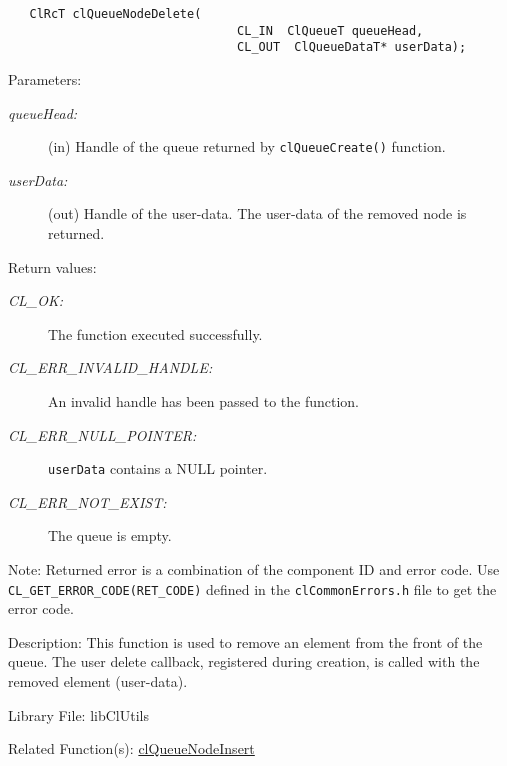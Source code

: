 \begin{flushleft}
\begin{Desc}
\footnotesize\begin{verbatim}   ClRcT clQueueNodeDelete(
                       			CL_IN  ClQueueT queueHead,
                       			CL_OUT  ClQueueDataT* userData);
\end{verbatim}
\normalsize
\end{Desc}
\begin{Desc}
\item[Parameters:]
\begin{description}
\item[{\em queue\-Head:}](in) Handle of the queue returned by {\tt{cl\-Queue\-Create()}} function. \item[{\em user\-Data:}](out) Handle of the user-data. 
The user-data of the removed node is returned.\end{description}
\end{Desc}
\begin{Desc}
\item[Return values:]
\begin{description}
\item[{\em CL\_\-OK:}]The function executed successfully. 
\item[{\em CL\_\-ERR\_\-INVALID\_\-HANDLE:}]An invalid handle has been passed to the function. 
\item[{\em CL\_\-ERR\_\-NULL\_\-POINTER:}]{\tt{userData}} contains a NULL pointer.
\item[{\em CL\_\-ERR\_\-NOT\_\-EXIST:}]The queue is empty.\end{description}
\end{Desc}
\begin{Desc}
\item[Note:]Returned error is a combination of the component ID and error code. Use
{\tt {CL\_\-GET\_\-ERROR\_\-CODE(RET\_\-CODE)}} defined in the {\tt{clCommonErrors.h}} file to get the error code.\end{Desc}
\begin{Desc}
\item[Description:]This function is used to remove an element from the front of the queue. The user delete callback, registered during creation, is 
called with the removed element (user-data).\end{Desc}
\begin{Desc}
\item[Library File:]lib\-Cl\-Utils\end{Desc}
\begin{Desc}
\item[Related Function(s):]\hyperlink{pageq102}{cl\-Queue\-Node\-Insert} \end{Desc}
\newpage


\end{flushleft}
